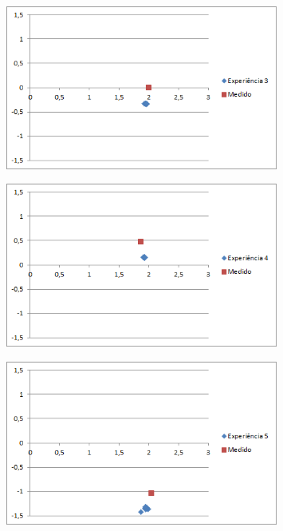 \begin{figure}
\begin{center}
	\includegraphics[width=0.80\textwidth]{figures/experiencia/pos_chart_exp3.png}
	\label{fig:pos_chart_exp3}
\end{center}
\end{figure}

\begin{figure}
\begin{center}
	\includegraphics[width=0.80\textwidth]{figures/experiencia/pos_chart_exp4.png}
	\label{fig:pos_chart_exp4}
\end{center}
\end{figure}

\begin{figure}
\begin{center}
	\includegraphics[width=0.80\textwidth]{figures/experiencia/pos_chart_exp5.png}
	\label{fig:pos_chart_exp5}
\end{center}
\end{figure}

